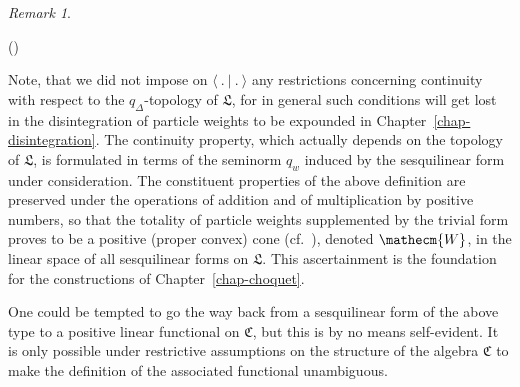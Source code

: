 \documentclass[11pt,twoside,openright]{report}
\theoremstyle{definition}
\theoremstyle{plain}
\theoremstyle{remark}
\newtheorem*{Rem}{Remark}
\theoremstyle{assumption}
\newcommand{\qD}{q_\Delta}
\newcommand{\scp}[2]{\langle #1 \vert #2 \rangle}
\newcommand{\Wecm}{\mathecm{W}}
\newcommand{\Cfrak}{\mathfrak{C}}
\newcommand{\Lfrak}{\mathfrak{L}}
\newcounter{remitem}
\newenvironment{remlist}{\begin{list}{(\roman{remitem})}%
  {\usecounter{remitem} \setlength{\topsep}{0ex}%
   \setlength{\parsep}{0.2ex} \setlength{\itemsep}{0.4ex}%
   \setlength{\leftmargin}{0em} \setlength{\itemindent}{0.5em}%
   }}{\end{list}}
\begin{document}
\begin{Rem}
  \begin{remlist}
  \item Note, that we did not impose on $\scp{~.~}{~.~}$ any
    restrictions concerning continuity with respect to the
    $\qD$-topology of $\Lfrak$, for in general such conditions will
    get lost in the disintegration of particle weights to be expounded
    in Chapter~\ref{chap-disintegration}. The continuity property,
    which actually depends on the topology of $\Lfrak$, is formulated
    in terms of the seminorm $q_w$ induced by the sesquilinear form
    under consideration. The constituent properties of the above
    definition are preserved under the operations of addition and of
    multiplication by positive numbers, so that the totality of
    particle weights supplemented by the trivial form proves to be a
    positive (proper convex) cone
    (cf.~\cite{peressini:1967,asimow/ellis:1980}), denoted $\Wecm$, in
    the linear space of all sesquilinear forms on $\Lfrak$. This
    ascertainment is the foundation for the constructions of
    Chapter~\ref{chap-choquet}.
  \item One could be tempted to go the way back from a sesquilinear
    form of the above type to a positive linear functional on
    $\Cfrak$, but this is by no means self-evident. It is only
    possible under restrictive assumptions on the structure of the
    algebra $\Cfrak$ to make the definition of the associated
    functional unambiguous.
  \end{remlist}
\end{Rem}
\end{document}
